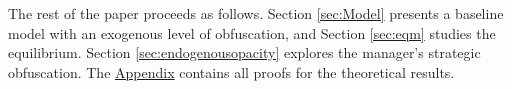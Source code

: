 The rest of the paper proceeds as follows. Section \ref{sec:Model} presents a baseline model with an exogenous level of obfuscation, and Section \ref{sec:eqm} studies the equilibrium. Section \ref{sec:endogenousopacity} explores the manager's strategic obfuscation. The \hyperref[app:appendix]{Appendix} contains all proofs for the theoretical results.